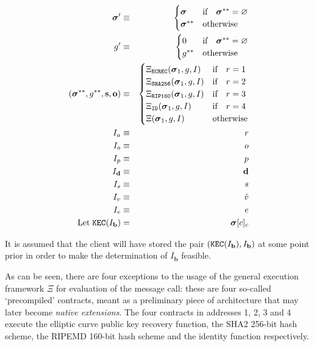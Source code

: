 \documentclass[9pt,oneside]{amsart}
\begin{document}
\begin{multicols}{2}
\begin{eqnarray}
\boldsymbol{\sigma}' & \equiv & \begin{cases}
\boldsymbol{\sigma} & \text{if} \quad \boldsymbol{\sigma}^{**} = \varnothing \\
\boldsymbol{\sigma}^{**} & \text{otherwise}
\end{cases} \\
g' & \equiv & \begin{cases}
0 & \text{if} \quad \boldsymbol{\sigma}^{**} = \varnothing \\
g^{**} & \text{otherwise}
\end{cases} \\
(\boldsymbol{\sigma}^{**}, g^{**}, \mathbf{s}, \mathbf{o}) & \equiv & \begin{cases}
\Xi_{\mathtt{ECREC}}(\boldsymbol{\sigma}_1, g, I) & \text{if} \quad r = 1 \\
\Xi_{\mathtt{SHA256}}(\boldsymbol{\sigma}_1, g, I) & \text{if} \quad r = 2 \\
\Xi_{\mathtt{RIP160}}(\boldsymbol{\sigma}_1, g, I) & \text{if} \quad r = 3 \\
\Xi_{\mathtt{ID}}(\boldsymbol{\sigma}_1, g, I) & \text{if} \quad r = 4 \\
\Xi(\boldsymbol{\sigma}_1, g, I) & \text{otherwise} \end{cases} \\
I_a & \equiv & r \\
I_o & \equiv & o \\
I_p & \equiv & p \\
I_\mathbf{d} & \equiv & \mathbf{d} \\
I_s & \equiv & s \\
I_v & \equiv & \tilde{v} \\
I_e & \equiv & e \\
\text{Let} \; \mathtt{\tiny KEC}(I_\mathbf{b}) & = & \boldsymbol{\sigma}[c]_c
\end{eqnarray}

It is assumed that the client will have stored the pair $(\mathtt{\tiny KEC}(I_\mathbf{b}), I_\mathbf{b})$ at some point prior in order to make the determination of $I_\mathbf{b}$ feasible.

As can be seen, there are four exceptions to the usage of the general execution framework $\Xi$ for evaluation of the message call: these are four so-called `precompiled' contracts, meant as a preliminary piece of architecture that may later become \textit{native extensions}. The four contracts in addresses 1, 2, 3 and 4 execute the elliptic curve public key recovery function, the SHA2 256-bit hash scheme, the RIPEMD 160-bit hash scheme and the identity function respectively.


\end{multicols}
\end{document}
